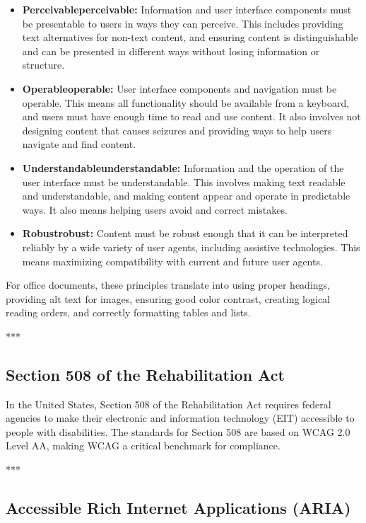 \begin{itemize}
	\item \textbf{Perceivable\gls{perceivable}:} Information and user interface components must be presentable to users in ways they can perceive. This includes providing text alternatives for non-text content, and ensuring content is distinguishable and can be presented in different ways without losing information or structure.
	\item \textbf{Operable\gls{operable}:} User interface components and navigation must be operable. This means all functionality should be available from a keyboard, and users must have enough time to read and use content. It also involves not designing content that causes seizures and providing ways to help users navigate and find content.
	\item \textbf{Understandable\gls{understandable}:} Information and the operation of the user interface must be understandable. This involves making text readable and understandable, and making content appear and operate in predictable ways. It also means helping users avoid and correct mistakes.
	\item \textbf{Robust\gls{robust}:} Content must be robust enough that it can be interpreted reliably by a wide variety of user agents, including assistive technologies. This means maximizing compatibility with current and future user agents.
\end{itemize}

For office documents, these principles translate into using proper headings, providing alt text for images, ensuring good color contrast, creating logical reading orders, and correctly formatting tables and lists.

***

\subsection{Section 508 of the Rehabilitation Act}
\label{sub:section-508-of-the-rehabilitation-act}

In the United States, Section 508 of the Rehabilitation Act requires federal agencies to make their electronic and information technology (EIT) accessible to people with disabilities. The standards for Section 508 are based on WCAG 2.0 Level AA, making \gls{WCAG} a critical benchmark for compliance\supercite{Section508}.

***

\subsection{Accessible Rich Internet Applications (ARIA)}
\label{sub:accessible-rich-internet-applications-aria}

